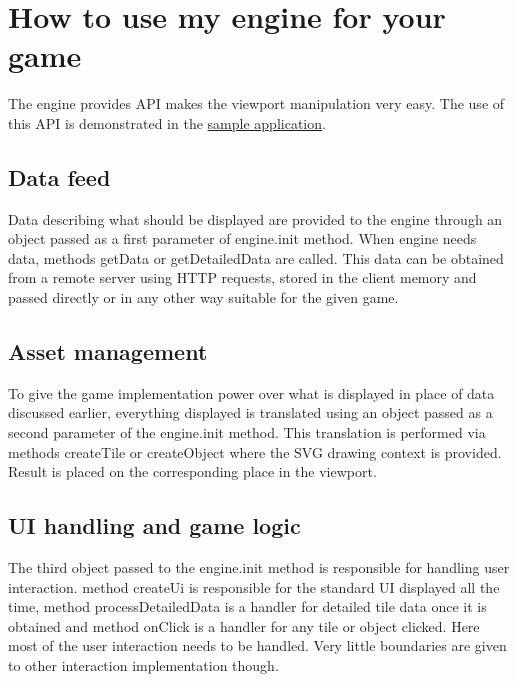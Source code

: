 \documentclass[11pt,oneside, final]{fithesis2}
\begin{document}
\appendix
\chapter{How to use my engine for your game}
The engine provides API makes the viewport manipulation very easy. The use of this API is demonstrated in the \href{https://github.com/vit-svoboda/svg-engine/tree/master/src/main/webapp/Scripts/game}{sample application}.

\section{Data feed}
Data describing what should be displayed are provided to the engine through an object passed as a first parameter of engine.init method. When engine needs data, methods getData or getDetailedData are called. This data can be obtained from a remote server using HTTP requests, stored in the client memory and passed directly or in any other way suitable for the given game.

\section{Asset management}
To give the game implementation power over what is displayed in place of data discussed earlier, everything displayed is translated using an object passed as a second parameter of the engine.init method. This translation is performed via methods createTile or createObject where the SVG drawing context is provided. Result is placed on the corresponding place in the viewport.

\section{UI handling and game logic}
The third object passed to the engine.init method is responsible for handling user interaction. method createUi is responsible for the standard UI displayed all the time, method processDetailedData is a handler for detailed tile data once it is obtained and method onClick is a handler for any tile or object clicked. Here most of the user interaction needs to be handled. Very little boundaries are given to other interaction implementation though.
\end{document}

